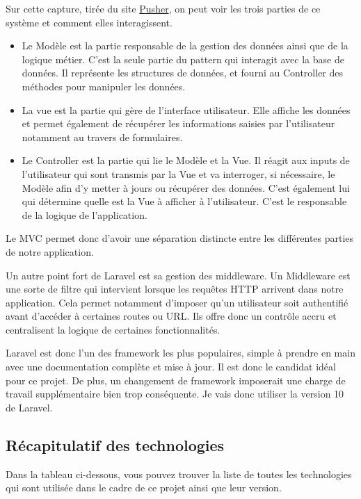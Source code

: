 Sur cette capture, tirée du site \href{https://pusher.com/blog/laravel-mvc-use/#what-is-mvc}{Pusher}, on peut voir les trois parties de ce système et comment elles interagissent.
\begin{itemize}
    \item Le Modèle est la partie responsable de la gestion des données ainsi que de la logique métier. C'est la seule partie du pattern qui interagit avec la base de données. Il représente les structures de données, et fourni au Controller des méthodes pour manipuler les données.
    \item La vue est la partie qui gère de l'interface utilisateur. Elle affiche les données et permet également de récupérer les informations saisies par l'utilisateur notamment au travers de formulaires.
    \item Le Controller est la partie qui lie le Modèle et la Vue. Il réagit aux inputs de l'utilisateur qui sont transmis par la Vue et va interroger, si nécessaire, le Modèle afin d'y metter à jours ou récupérer des données. C'est également lui qui détermine quelle est la Vue à afficher à l'utilisateur. C'est le responsable de la logique de l'application.
\end{itemize}
Le MVC permet donc d'avoir une séparation distincte entre les différentes parties de notre application.

Un autre point fort de Laravel est sa gestion des middleware. Un Middleware est une sorte de filtre qui intervient lorsque les requêtes HTTP arrivent dans notre application. Cela permet notamment d'imposer qu'un utilisateur soit authentifié avant d'accéder à certaines routes ou URL. Ils offre donc un contrôle accru et centralisent la logique de certaines fonctionnalités.

Laravel est donc l'un des framework les plus populaires, simple à prendre en main avec une documentation complète et mise à jour. Il est donc le candidat idéal pour ce projet. De plus, un changement de framework imposerait une charge de travail supplémentaire bien trop conséquente.
Je vais donc utiliser la version 10 de Laravel.

\subsection{Récapitulatif des technologies}
Dans la tableau ci-dessous, vous pouvez trouver la liste de toutes les technologies qui sont utilisée dans le cadre de ce projet ainsi que leur version.